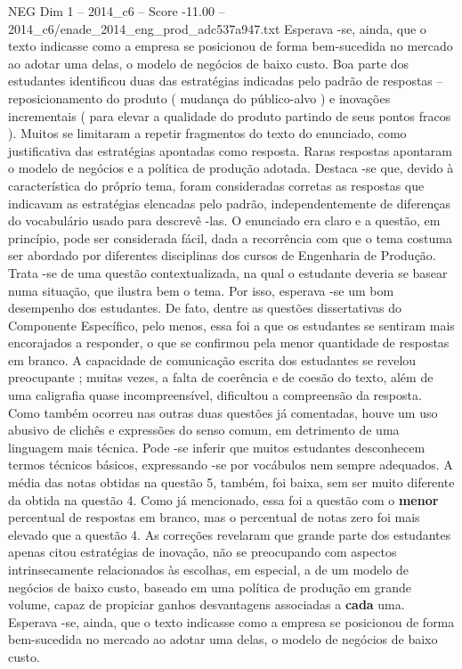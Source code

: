 \begin{textsample}{NEG Dim 1 – 2014\_c6 – Score -11.00 – 2014\_c6/enade\_2014\_eng\_prod\_adc537a947.txt}
Esperava -se, ainda, que o texto indicasse como a empresa se posicionou de forma bem-sucedida no mercado ao adotar uma delas, o modelo de negócios de baixo custo.
Boa parte dos estudantes identificou duas das estratégias indicadas pelo padrão de respostas – reposicionamento do produto ( mudança do público-alvo ) e inovações incrementais ( para elevar a qualidade do produto partindo de seus pontos fracos ).
Muitos se limitaram a repetir fragmentos do texto do enunciado, como justificativa das estratégias apontadas como resposta.
Raras respostas apontaram o modelo de negócios e a política de produção adotada.
Destaca -se que, devido à característica do próprio tema, foram consideradas corretas as respostas que indicavam as estratégias elencadas pelo padrão, independentemente de diferenças do vocabulário usado para descrevê -las.
O enunciado era claro e a questão, em princípio, pode ser considerada fácil, dada a recorrência com que o tema costuma ser abordado por diferentes disciplinas dos cursos de Engenharia de Produção.
Trata -se de uma questão contextualizada, na qual o estudante deveria se basear numa situação, que ilustra bem o tema.
Por isso, esperava -se um bom desempenho dos estudantes.
De fato, dentre as questões dissertativas do Componente Específico, pelo menos, essa foi a que os estudantes se sentiram mais encorajados a responder, o que se confirmou pela menor quantidade de respostas em branco.
A capacidade de comunicação escrita dos estudantes se revelou preocupante ; muitas vezes, a falta de coerência e de coesão do texto, além de uma caligrafia quase incompreensível, dificultou a compreensão da resposta.
Como também ocorreu nas outras duas questões já comentadas, houve um uso abusivo de clichês e expressões do senso comum, em detrimento de uma linguagem mais técnica.
Pode -se inferir que muitos estudantes desconhecem termos técnicos básicos, expressando -se por vocábulos nem sempre adequados.
A média das notas obtidas na questão 5, também, foi baixa, sem ser muito diferente da obtida na questão 4.
Como já mencionado, essa foi a questão com o \textbf{menor} percentual de respostas em branco, mas o percentual de notas zero foi mais elevado que a questão 4.
As correções revelaram que grande parte dos estudantes apenas citou estratégias de inovação, não se preocupando com aspectos intrinsecamente relacionados às escolhas, em especial, a de um modelo de negócios de baixo custo, baseado em uma política de produção em grande volume, capaz de propiciar ganhos desvantagens associadas a \textbf{cada} uma.
Esperava -se, ainda, que o texto indicasse como a empresa se posicionou de forma bem-sucedida no mercado ao adotar uma delas, o modelo de negócios de baixo custo.

\end{textsample}
